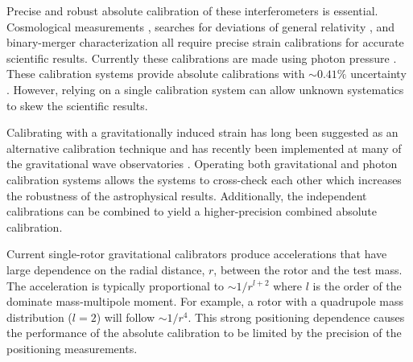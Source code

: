 \documentclass[superscriptaddress, twocolumn, prd]{revtex4-1}
\begin{document}
Precise and robust absolute calibration of these interferometers is essential. Cosmological measurements \cite{abbott2021gravitational, ligo2017gravitational, schutz1986determining}, searches for deviations of general relativity \cite{abbott2020tests}, and binary-merger characterization \cite{abbott2020population} all require precise strain calibrations for accurate scientific results. Currently these calibrations are made using photon pressure \cite{PCal}. These calibration systems provide absolute calibrations with $\sim0.41\%$ uncertainty \cite{Bhattacharjee_2020}. However, relying on a single calibration system can allow unknown systematics to skew the scientific results.

%

Calibrating with a gravitationally induced strain has long been suggested as an alternative calibration technique \cite{hirakawa1980dynamical, kuroda1985experimental, mio1987experimental, astone1991evaluation, astone1998experimental, Matone_2007} and has recently been implemented at many of the gravitational wave observatories \cite{Estevez_2018, estevez2021newtonian, PhysRevD.98.022005, ncal}. Operating both gravitational and photon calibration systems allows the systems to cross-check each other which increases the robustness of the astrophysical results. Additionally, the independent calibrations can be combined to yield a higher-precision combined absolute calibration.

Current single-rotor gravitational calibrators \cite{Estevez_2018, estevez2021newtonian, PhysRevD.98.022005, ncal} produce accelerations that have large dependence on the radial distance, $r$, between the rotor and the test mass. The acceleration is typically proportional to $\sim1/r^{l+2}$ where $l$ is the order of the dominate mass-multipole moment. For example, a rotor with a quadrupole mass distribution ($l=2$) will follow $\sim1/r^4$. This strong positioning dependence causes the performance of the absolute calibration to be limited by the precision of the positioning measurements. 
\end{document}
